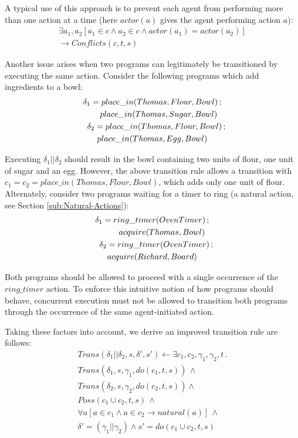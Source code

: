 \documentclass[letterpaper]{article}
\begin{document}
A typical use of this approach is to prevent each agent from performing
more than one action at a time (here $actor(a)$ gives the agent performing
action $a$):
\begin{multline}
\exists a_{1},a_{2}\left[a_{1}\in c\wedge a_{2}\in c\wedge actor(a_{1})=actor(a_{2})\right]\\
\rightarrow Conflicts(c,t,s)
\end{multline}

Another issue arises when two programs can legitimately be transitioned
by executing the same action. Consider the following programs which
add ingredients to a bowl:
\begin{multline}
\delta_{1}=place\_ in(Thomas,Flour,Bowl)\,;\\
   \shoveright{place\_ in(Thomas,Sugar,Bowl)}\\
\shoveleft{\delta_{2}=place\_ in(Thomas,Flour,Bowl)\,;}\\
   place\_ in(Thomas,Egg,Bowl)
\end{multline}

Executing $\delta_{1}||\delta_{2}$ should result in the bowl containing
two units of flour, one unit of sugar and an egg. However, the above
transition rule allows a transition with $c_{1}=c_{2}=place\_ in(Thomas,Flour,Bowl)$,
which adds only one unit of flour. Alternately, consider two programs
waiting for a timer to ring (a natural action, see Section \ref{sub:Natural-Actions}):
\begin{multline}
\delta_{1}=ring\_ timer(OvenTimer)\,;\\
   \shoveright{acquire(Thomas,Bowl)}\\
\shoveleft{\delta_{2}=ring\_ timer(OvenTimer)\,;}\\
    acquire(Richard,Board)
\end{multline}


Both programs should be allowed to proceed with a single occurrence
of the $ring\_ timer$ action. To enforce this intuitive notion of
how programs should behave, concurrent execution must not be allowed
to transition both programs through the occurrence of the same agent-initiated
action.

Taking these factors into account, we derive an improved transition
rule are follows:
\begin{multline}
Trans(\delta_{1}||\delta_{2},s,\delta',s')\leftarrow \exists c_{1},c_{2},\gamma_{1},\gamma_{2},t\,.\\
Trans(\delta_{1},s,\gamma_{1},do(c_{1},t,s))\,\wedge\\
Trans(\delta_{2},s,\gamma_{2},do(c_{2},t,s))\wedge\\
Poss(c_{1}\cup c_{2},t,s)\,\wedge\\
\forall a\left[a\in c_{1}\wedge a\in c_{2}\rightarrow natural(a)\right]\,\wedge\\
\delta'=(\gamma_{1}||\gamma_{2})\wedge s'=do(c_{1}\cup c_{2},t,s)
\end{multline}
\end{document}
